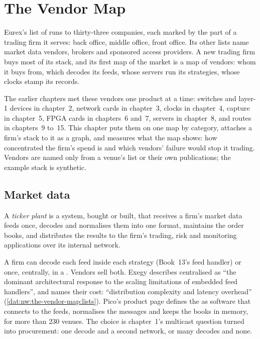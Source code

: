 \chapter{The Vendor Map}\label{ch:nw:the-vendor-map}

Eurex's list of  runs to thirty-three companies, each marked by the part of a trading firm it
serves: back office, middle office, front office. Its other lists name market data vendors, brokers and sponsored access
providers. A new trading firm buys most of its stack, and its first map of the market is a map of vendors: whom it buys
 from, which  decodes its feeds, whose servers run its strategies, whose clocks stamp its records.

The earlier chapters met these vendors one product at a time: switches and layer-1 devices in chapter~2, network cards in
chapter~3, clocks in chapter~4, capture in chapter~5, FPGA cards in chapters~6 and~7, servers in chapter~8,  and
routes in chapters~9 to~15. This chapter puts them on one map by category, attaches a firm's stack to it as a graph, and
measures what the map shows: how concentrated the firm's spend is and which vendors' failure would stop it trading. Vendors
are named only from a venue's list or their own publications; the example stack is synthetic.

\section{Market data}

\begin{definition}\label{def:nw:the-vendor-map:tickerplant}
A \emph{ticker plant} is a system, bought or built, that receives a firm's market data feeds once, decodes
and normalises them into one format, maintains the order books, and distributes the results to the firm's trading, risk and
monitoring applications over its internal network.
\end{definition}

A firm can decode each feed inside each strategy (Book~13's feed handler) or once, centrally, in a .
Vendors sell both. Exegy describes centralised  as ``the dominant architectural response to the scaling
limitations of embedded feed handlers'', and names their cost: ``distribution complexity and latency overhead''
(\cref{dat:nw:the-vendor-map:lists}). Pico's product page defines the  as software that connects to the feeds,
normalises the messages and keeps the books in memory, for more than 230 venues. The choice is chapter~1's multicast question
turned into procurement: one decode and a second network, or many decodes and none.

